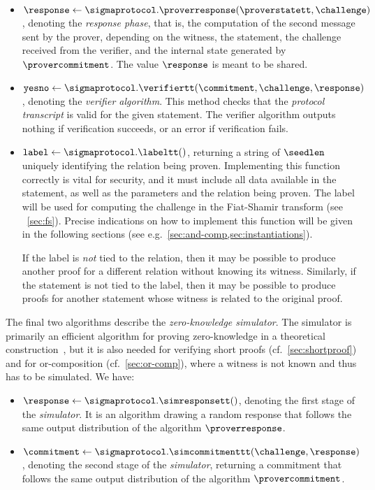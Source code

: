 \documentclass[11pt]{article}
\begin{document}
\begin{itemize}
        \item
          $\response \gets \sigmaprotocol.\proverresponse(\proverstatett, \challenge)$,
          denoting the \emph{response phase}, that is, the computation of the second message sent by the prover, depending on the witness, the statement, the challenge received from the verifier, and the internal state generated by $\provercommitment$.
          The value $\response$ is meant to be shared.
        \item $\texttt{yesno} \gets \sigmaprotocol.\verifiertt(\commitment, \challenge, \response)$,
          denoting the \emph{verifier algorithm}. This method checks that
          the \emph{protocol transcript} is valid for the given statement.
          The verifier algorithm outputs nothing if verification succeeds,
          or an error if verification fails.
          \item $\texttt{label} \gets\sigmaprotocol.\labeltt()$,
          returning a string of $\seedlen$ uniquely identifying the relation being proven.
          Implementing this function correctly is vital for security, and it must include all data available in the statement, as well as the parameters and the relation being proven. The label will be used for computing the challenge in the Fiat-Shamir transform (see ~\cref{sec:fs}).
          Precise indications on how to implement this function will be given in the following sections (see e.g.\ \cref{sec:and-comp,sec:instantiations}).

          If the label is \emph{not} tied to the relation, then it may be possible to produce another proof for a different relation without knowing its witness.
          Similarly, if the statement is not tied to the label, then it may be possible to produce proofs for another statement whose witness is related to the original proof.
      \end{itemize}
      The final two algorithms describe the \emph{zero-knowledge simulator}.
      The simulator is primarily an efficient algorithm for proving zero-knowledge in a theoretical construction~\cite{becafi19}, but it is also needed for verifying short proofs (cf.~\cref{sec:shortproof}) and for or-composition (cf.~\cref{sec:or-comp}), where a witness is not known and thus has to be simulated. We have:
      \begin{itemize}
        \item $\response \gets \sigmaprotocol.\simresponsett()$,
        denoting the first stage of the \emph{simulator}. It is an algorithm drawing a random response that follows the same output distribution of the algorithm $\proverresponse$.
        \item $\commitment \gets \sigmaprotocol.\simcommitmenttt(\challenge, \response)$, denoting the second stage of the \emph{simulator}, returning a commitment that follows the same output distribution of the algorithm $\provercommitment$.
      \end{itemize}
\end{document}
